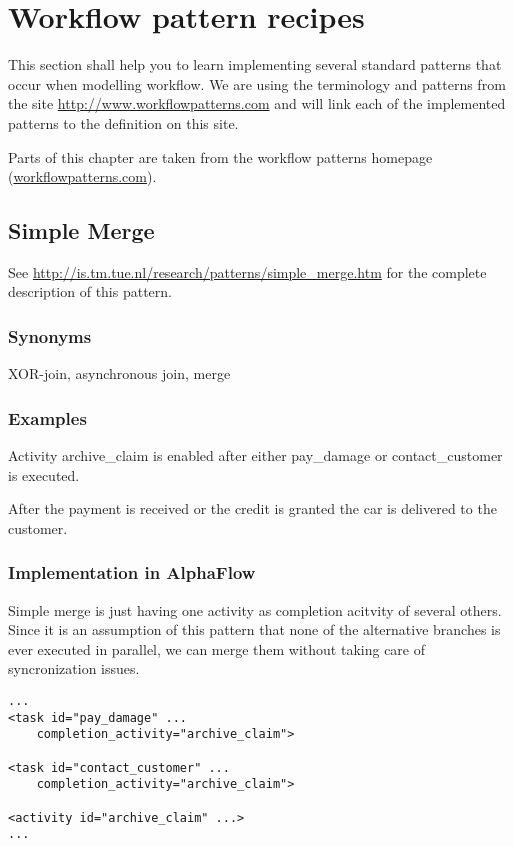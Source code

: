 \chapter{Workflow pattern recipes}

This section shall help you to learn implementing several standard patterns
that occur when modelling workflow. We are using the terminology and patterns
from the site \url{http://www.workflowpatterns.com} and will link each of the
implemented patterns to the definition on this site.

Parts of this chapter are taken from the workflow patterns homepage (\url{workflowpatterns.com}).

\section{Simple Merge}

See \url{http://is.tm.tue.nl/research/patterns/simple_merge.htm} for the complete description of this pattern.

\subsection{Synonyms}

XOR-join, asynchronous join, merge

\subsection{Examples}

Activity archive_claim is enabled after either pay_damage or contact_customer is executed.

After the payment is received or the credit is granted the car is delivered to the customer.

\subsection{Implementation in AlphaFlow}

Simple merge is just having one activity as completion acitvity of several others. Since it is an assumption of this pattern that none of the alternative branches is ever executed in parallel, we can merge them without taking care of syncronization issues.

\begin{verbatim}
...
<task id="pay_damage" ...
    completion_activity="archive_claim">

<task id="contact_customer" ...
    completion_activity="archive_claim">

<activity id="archive_claim" ...>
...

\end{verbatim}


